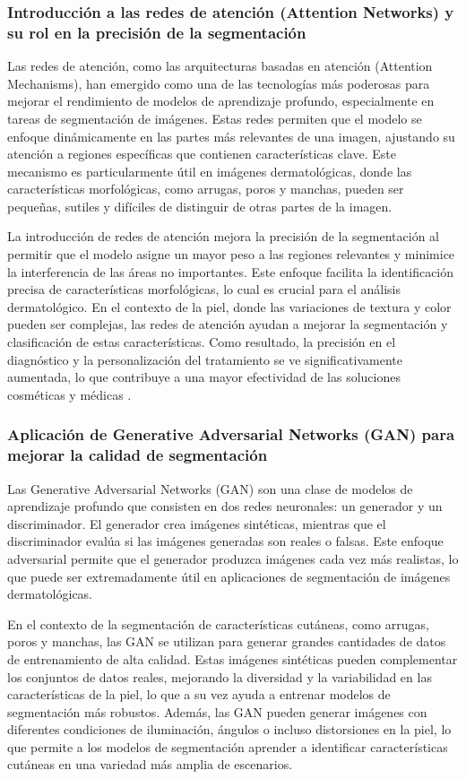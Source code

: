 \subsubsection{Introducción a las redes de atención (Attention Networks) y su rol en la precisión de la segmentación}
Las redes de atención, como las arquitecturas basadas en atención (Attention Mechanisms), han emergido como una de las tecnologías más poderosas para mejorar el rendimiento de modelos de aprendizaje profundo, especialmente en tareas de segmentación de imágenes. Estas redes permiten que el modelo se enfoque dinámicamente en las partes más relevantes de una imagen, ajustando su atención a regiones específicas que contienen características clave. Este mecanismo es particularmente útil en imágenes dermatológicas, donde las características morfológicas, como arrugas, poros y manchas, pueden ser pequeñas, sutiles y difíciles de distinguir de otras partes de la imagen.

La introducción de redes de atención mejora la precisión de la segmentación al permitir que el modelo asigne un mayor peso a las regiones relevantes y minimice la interferencia de las áreas no importantes. Este enfoque facilita la identificación precisa de características morfológicas, lo cual es crucial para el análisis dermatológico. En el contexto de la piel, donde las variaciones de textura y color pueden ser complejas, las redes de atención ayudan a mejorar la segmentación y clasificación de estas características. Como resultado, la precisión en el diagnóstico y la personalización del tratamiento se ve significativamente aumentada, lo que contribuye a una mayor efectividad de las soluciones cosméticas y médicas \parencite{wang2018}.

%
\subsubsection{Aplicación de Generative Adversarial Networks (GAN) para mejorar la calidad de segmentación}
Las Generative Adversarial Networks (GAN) son una clase de modelos de aprendizaje profundo que consisten en dos redes neuronales: un generador y un discriminador. El generador crea imágenes sintéticas, mientras que el discriminador evalúa si las imágenes generadas son reales o falsas. Este enfoque adversarial permite que el generador produzca imágenes cada vez más realistas, lo que puede ser extremadamente útil en aplicaciones de segmentación de imágenes dermatológicas.

En el contexto de la segmentación de características cutáneas, como arrugas, poros y manchas, las GAN se utilizan para generar grandes cantidades de datos de entrenamiento de alta calidad. Estas imágenes sintéticas pueden complementar los conjuntos de datos reales, mejorando la diversidad y la variabilidad en las características de la piel, lo que a su vez ayuda a entrenar modelos de segmentación más robustos. Además, las GAN pueden generar imágenes con diferentes condiciones de iluminación, ángulos o incluso distorsiones en la piel, lo que permite a los modelos de segmentación aprender a identificar características cutáneas en una variedad más amplia de escenarios.

